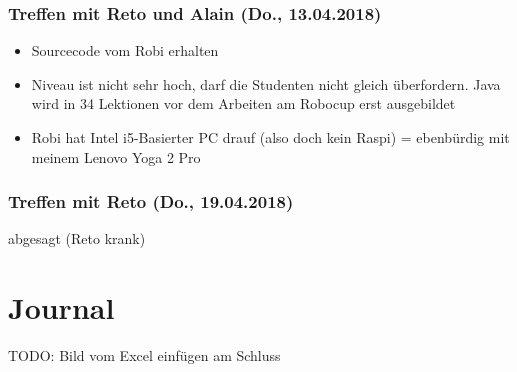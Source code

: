 \subsubsection{Treffen mit Reto und Alain (Do., 13.04.2018)}
\begin{itemize}
	\item Sourcecode vom Robi erhalten
	\item Niveau ist nicht sehr hoch, darf die Studenten nicht gleich überfordern. Java wird in 34 Lektionen vor dem Arbeiten am Robocup erst ausgebildet
	\item Robi hat Intel i5-Basierter PC drauf (also doch kein Raspi) = ebenbürdig mit meinem Lenovo Yoga 2 Pro
\end{itemize}
\subsubsection{Treffen mit Reto (Do., 19.04.2018)}
abgesagt (Reto krank)

\section{Journal}
TODO: Bild vom Excel einfügen am Schluss